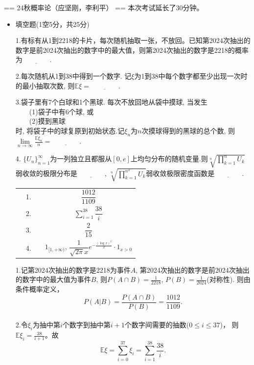== 24秋概率论（应坚刚，李利平） ==
本次考试延长了30分钟。

\begin{itemize}
    \item[一.]填空题(1空5分，共25分)\par
    1.有标有从1到2218的卡片，每次随机抽取一张，不放回。已知第2024次抽出的数字是前2024次抽出的数字中的最大值，则第2024次抽出的数字是2218的概率为$\underline{\qquad\qquad}$.\par
    2.每次随机从1到38中得到一个数字. 记$\xi$为1到38中每个数字都至少出现一次时的最小抽取次数, 则$\mathbb{E}\xi=\underline{\qquad\qquad}$.\par
    3.袋子里有7个白球和1个黑球. 每次不放回地从袋中摸球, 当发生\\
    \ \ \ \ (1)袋子中有6个球, 或\\
    \ \ \ \ (2)摸到黑球\\
    时, 将袋子中的球复原到初始状态.记$\xi_n$为$n$次摸球得到的黑球的总个数, 
    则$\lim\limits_{n\to\infty}\frac{\mathbb{E}\xi_n}{n}=\underline{\qquad\qquad}$.\par
    4. $\{U_n\}_{n=1}^{\infty}$为一列独立且都服从$[0,e]$上均匀分布的随机变量.则$\sqrt[n]{\prod\limits_{k=1}^{n}U_k}$弱收敛的极限分布是$\underline{\qquad\qquad}$, 
    $\sqrt[n]{\prod\limits_{k=1}^{n^2}U_k}$弱收敛极限密度函数是$\underline{\qquad\qquad}$.\par
    \begin{proofc}[解答]
        \begin{center}\begin{tabular}{cc}
        \ \ 1.\ \ &$\dfrac{1012}{1109}$\\
        2.&$\sum\limits_{i=1}^{38} \dfrac{38}{i}$\\
        3.&$\dfrac{2}{15}$\\
        4.&$1_{[1,+\infty)}$, $\dfrac{1}{\sqrt{2\pi}x}e^{-\frac{(\log{x})^2}{2}}\cdot1_{x>0}$
        \end{tabular}\end{center}
        1.记第2024次抽出的数字是2218为事件$A$, 第2024次抽出的数字是前2024次抽出的数字中的最大值为事件$B$, 
        则$P({A}\cap{B})=\frac{1}{2218}$, $P(B)=\frac{1}{2024}$(对称性). 
        则由条件概率定义，\[P(A|B)=\frac{P({A}\cap{B})}{P(B)}=\frac{1012}{1109}.\]
        \\
        2.令$\xi_{i}$为抽中第$i$个数字到抽中第$i+1$个数字间需要的抽数(${0}\le{i}\le{37}$)，
        则$\mathbb{E}\xi_{i}=\frac{38}{i+1}$。故
        \[\mathbb{E}\xi=\sum_{i=0}^{37} \xi_{i}=\sum_{i=1}^{38} \frac{38}{i}.\]
        \\

\end{proofc}
\end{itemize}
